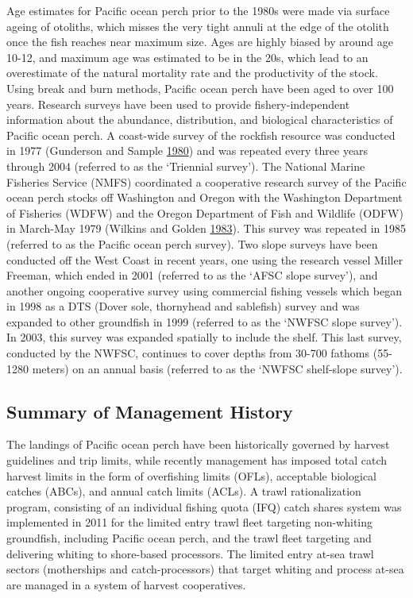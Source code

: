 \documentclass[12pt,]{article}
\begin{document}
Age estimates for Pacific ocean perch prior to the 1980s were made via
surface ageing of otoliths, which misses the very tight annuli at the
edge of the otolith once the fish reaches near maximum size. Ages are
highly biased by around age 10-12, and maximum age was estimated to be
in the 20s, which lead to an overestimate of the natural mortality rate
and the productivity of the stock. Using break and burn methods, Pacific
ocean perch have been aged to over 100 years. Research surveys have been
used to provide fishery-independent information about the abundance,
distribution, and biological characteristics of Pacific ocean perch. A
coast-wide survey of the rockfish resource was conducted in 1977
(Gunderson and Sample
\protect\hyperlink{ref-gunderson_distribution_1980}{1980}) and was
repeated every three years through 2004 (referred to as the `Triennial
survey'). The National Marine Fisheries Service (NMFS) coordinated a
cooperative research survey of the Pacific ocean perch stocks off
Washington and Oregon with the Washington Department of Fisheries (WDFW)
and the Oregon Department of Fish and Wildlife (ODFW) in March-May 1979
(Wilkins and Golden
\protect\hyperlink{ref-wilkins_condition_1983}{1983}). This survey was
repeated in 1985 (referred to as the Pacific ocean perch survey). Two
slope surveys have been conducted off the West Coast in recent years,
one using the research vessel Miller Freeman, which ended in 2001
(referred to as the `AFSC slope survey'), and another ongoing
cooperative survey using commercial fishing vessels which began in 1998
as a DTS (Dover sole, thornyhead and sablefish) survey and was expanded
to other groundfish in 1999 (referred to as the `NWFSC slope survey').
In 2003, this survey was expanded spatially to include the shelf. This
last survey, conducted by the NWFSC, continues to cover depths from
30-700 fathoms (55-1280 meters) on an annual basis (referred to as the
`NWFSC shelf-slope survey').

\subsection{Summary of Management
History}\label{summary-of-management-history}

The landings of Pacific ocean perch have been historically governed by
harvest guidelines and trip limits, while recently management has
imposed total catch harvest limits in the form of overfishing limits
(OFLs), acceptable biological catches (ABCs), and annual catch limits
(ACLs). A trawl rationalization program, consisting of an individual
fishing quota (IFQ) catch shares system was implemented in 2011 for the
limited entry trawl fleet targeting non-whiting groundfish, including
Pacific ocean perch, and the trawl fleet targeting and delivering
whiting to shore-based processors. The limited entry at-sea trawl
sectors (motherships and catch-processors) that target whiting and
process at-sea are managed in a system of harvest cooperatives.
\end{document}
